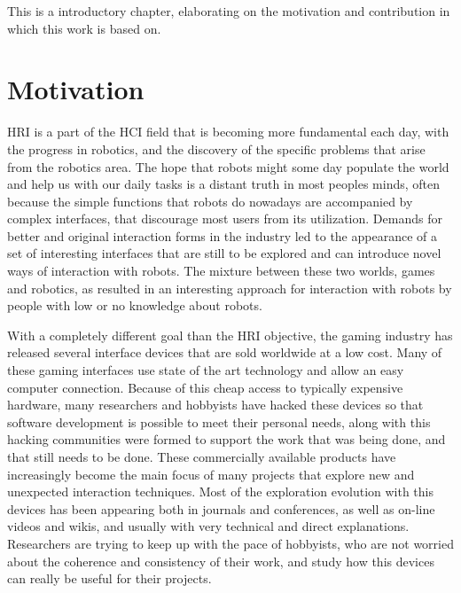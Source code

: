 
	This is a introductory chapter, elaborating on the motivation and contribution in which this work is based on.

\section{Motivation}

 \acf{HRI} is a part of the \acf{HCI} field that is becoming more fundamental each day, with the progress in robotics, and the discovery of the specific problems that arise from the robotics area\cite{hri:springerlink:10.1007/s12369-010-0081-8}. The hope that robots might some day populate the world and help us with our daily tasks is a distant truth in most peoples minds, often because the simple functions that robots do nowadays are accompanied by complex interfaces, that discourage most users from its utilization. Demands for better and original interaction forms in the industry led to the appearance of a set of interesting interfaces that are still to be explored and can introduce novel ways of interaction with robots. The mixture between these two worlds, games and robotics, as resulted in an interesting approach for interaction with robots by people with low or no knowledge about robots.
 
 With a completely different goal than the \ac{HRI} objective, the gaming industry has released several interface devices that are sold worldwide at a low cost. Many of these gaming interfaces use state of the art technology and allow an easy computer connection. Because of this cheap access to typically expensive hardware, many researchers and hobbyists have hacked these devices so that software development is possible to meet their personal needs, along with this hacking communities were formed to support the work that was being done, and that still needs to be done. These commercially available products have increasingly become the main focus of many projects that explore new and unexpected interaction techniques. Most of the exploration evolution with this devices has been appearing both in journals and conferences, as well as on-line videos and wikis, and usually with very technical and direct explanations. Researchers are trying to keep up with the pace of hobbyists, who are not worried about the coherence and consistency of their work, and study how this devices can really be useful for their projects.

